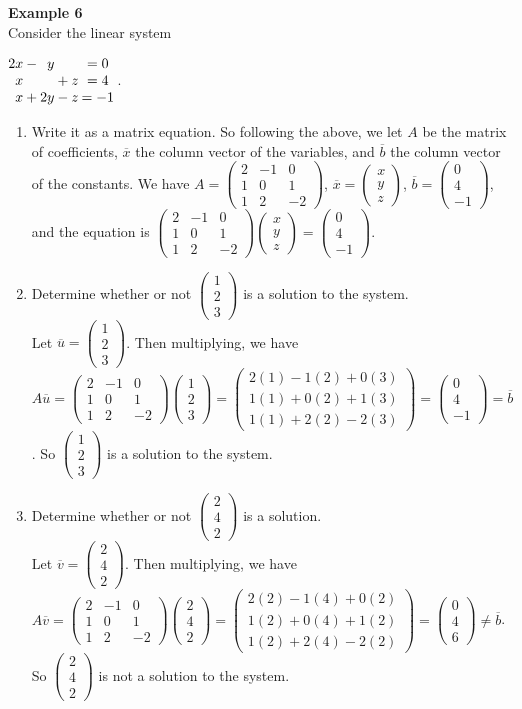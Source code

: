 \documentclass[12pt]{article}
\makeatletter
\def\it{\item}
\def\be{\begin{enumerate}} \def\ee{\end{enumerate}}
\def\bc{\begin{center}} \def\ec{\end{center}}
\def\bar#1{\overline{#1}}
\def\colll#1#2#3{\begin{pmatrix} #1 \\ #2 \\ #3 \end{pmatrix}}
\newenvironment{linsys}[2][m]{%
\setlength{\arraycolsep}{.1111em} %
\begin{array}[#1]{@{}*{#2}{rc}r@{}} 
}{%
\end{array}}
\makeatother
\begin{document}
\noindent
{\bf Example 6} \\
Consider the linear system
\bc
$\begin{linsys}{3}
2x &- &y  &\ &\  &= 0 \\
 x &  &\  &+ &z &= 4 \\
 x &+ &2y &- &z &= -1
\end{linsys}$.
\ec

\be
\it Write it as a matrix equation. So following the above, we let $A$ be the matrix of coefficients, $\bar{x}$ the column vector of the variables, and $\bar{b}$ the column vector of the constants. We have $A = \begin{pmatrix} 2 & -1 & 0 \\ 1 & 0 & 1 \\ 1 & 2 & -2 \end{pmatrix}$, $\bar{x} = \colll{x}{y}{z}$, $\bar{b} = \colll{0}{4}{-1}$, and the equation is 
$\begin{pmatrix} 2 & -1 & 0 \\ 1 & 0 & 1 \\ 1 & 2 & -2 \end{pmatrix} \colll{x}{y}{z} = \colll{0}{4}{-1}$.
\it Determine whether or not $\colll{1}{2}{3}$ is a solution to the system. \\
Let $\bar{u} = \colll{1}{2}{3}$. Then multiplying, we have $A\bar{u} = 
\begin{pmatrix} 2 & -1 & 0 \\ 1 & 0 & 1 \\ 1 & 2 & -2 \end{pmatrix} \colll{1}{2}{3} = \colll{2(1)-1(2)+0(3)}{1(1)+0(2)+1(3)}{1(1)+2(2)-2(3)} = \colll{0}{4}{-1} = \bar{b}$. So $\colll{1}{2}{3}$ is a solution to the system. 
\it Determine whether or not $\colll{2}{4}{2}$ is a solution. \\
Let $\bar{v} = \colll{2}{4}{2}$. Then multiplying, we have $A\bar{v} =
\begin{pmatrix} 2 & -1 & 0 \\ 1 & 0 & 1 \\ 1 & 2 & -2 \end{pmatrix} \colll{2}{4}{2} = \colll{2(2)-1(4)+0(2)}{1(2)+0(4)+1(2)}{1(2)+2(4)-2(2)} = \colll{0}{4}{6}
\not= \bar{b}$. So $\colll{2}{4}{2}$ is not a solution to the system.
\ee
\end{document}
